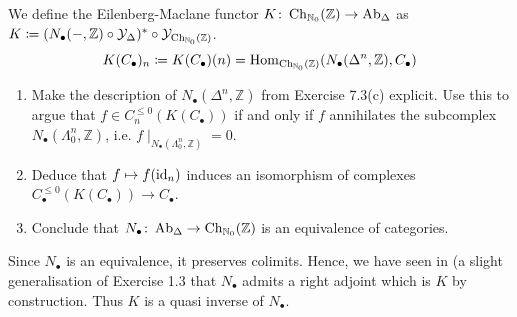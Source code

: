 \begin{Exercise}
	We define the Eilenberg-Maclane functor $ K \colon \operatorname{Ch}_{ \mathbb{ N }_0 } ( \mathbb{ Z } ) \to \operatorname{Ab}_{ \Delta } $ as $ K \coloneqq ( N_{ \bullet } ( - , \mathbb{ Z } ) \circ \mathcal{ Y }_{ \Delta } )^* \circ \mathcal{ Y }_{ \operatorname{Ch}_{ \mathbb{ N }_0 } ( \mathbb{ Z } ) } $.
	\[
	K ( C_{ \bullet } )_n \coloneqq K ( C_{ \bullet } ) ( n ) = \operatorname{Hom}_{ \operatorname{Ch}_{ \mathbb{ N }_0 } ( \mathbb{ Z } ) } ( N_{ \bullet } ( \Delta^n , \mathbb{ Z } ) , C_{ \bullet } )
	\]
	
	\begin{enumerate}[resume, label=(\alph*)]
		\item 
		Make the description of $ N_{ \bullet } ( \Delta^n , \mathbb{ Z } ) $ from Exercise 7.3(c) explicit.
		Use this to argue that $ f \in C_n^{ \leq 0 } ( K ( C_{ \bullet } ) ) $ if and only if $ f $ annihilates the subcomplex $ N_{ \bullet } ( \Lambda_0^n , \mathbb{ Z } ) $, i.e. $ f \mid_{ N_{ \bullet } ( \Lambda_0^n , \mathbb{ Z } ) } = 0 $.
		
		\item 
		Deduce that $ f \mapsto f ( \operatorname{id}_n ) $ induces an isomorphism of complexes $ C_{ \bullet }^{ \leq 0 } ( K ( C_{ \bullet } ) ) \to C_{ \bullet } $.
		
		\item 
		Conclude that $ N_{ \bullet } \colon \operatorname{Ab}_{ \Delta } \to \operatorname{Ch}_{ \mathbb{ N }_0 } ( \mathbb{ Z } ) $ is an equivalence of categories.
	\end{enumerate}
	
	Since $ N_{ \bullet } $ is an equivalence, it preserves colimits. Hence, we have seen in (a slight generalisation of Exercise 1.3 that $ N_{ \bullet } $ admits a right adjoint which is $ K $ by construction. Thus $ K $ is a quasi inverse of $ N_{ \bullet } $.
\end{Exercise}


